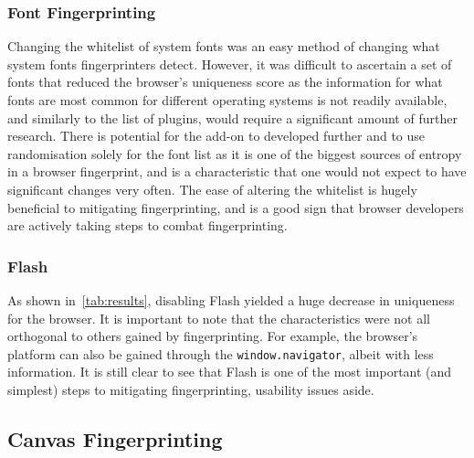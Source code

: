 \subsubsection{Font Fingerprinting}

Changing the whitelist of system fonts was an easy method of changing what system fonts fingerprinters detect.
However, it was difficult to ascertain a set of fonts that reduced the browser's uniqueness score as the information for what fonts are most common for different operating systems is not readily available, and similarly to the list of plugins, would require a significant amount of further research.
There is potential for the add-on to developed further and to use randomisation solely for the font list as it is one of the biggest sources of entropy in a browser fingerprint, and is a characteristic that one would not expect to have significant changes very often.
The ease of altering the whitelist is hugely beneficial to mitigating fingerprinting, and is a good sign that browser developers are actively taking steps to combat fingerprinting.

\subsubsection{Flash}

As shown in~\ref{tab:results}, disabling Flash yielded a huge decrease in uniqueness for the browser.
It is important to note that the characteristics were not all orthogonal to others gained by fingerprinting.
For example, the browser's platform can also be gained through the \texttt{window.navigator}, albeit with less information.
It is still clear to see that Flash is one of the most important (and simplest) steps to mitigating fingerprinting, usability issues aside.

\subsection{Canvas Fingerprinting}

